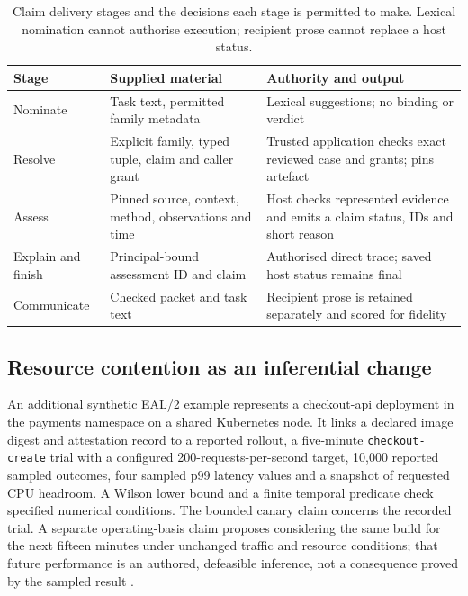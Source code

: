\documentclass[preprint,12pt]{elsarticle}
\begin{document}
\begin{table}[!htbp]
\centering
\small
\setlength{\tabcolsep}{4pt}
\caption{Claim delivery stages and the decisions each stage is permitted to make. Lexical nomination cannot authorise execution; recipient prose cannot replace a host status.}
\label{tab:host-architecture}
\begin{tabular}{@{}>{\raggedright\arraybackslash}p{2.5cm}>{\raggedright\arraybackslash}p{3.9cm}>{\raggedright\arraybackslash}p{4.7cm}@{}}
\toprule
Stage & Supplied material & Authority and output\\
\midrule
Nominate & Task text, permitted family metadata & Lexical suggestions; no binding or verdict\\
Resolve & Explicit family, typed tuple, claim and caller grant & Trusted application checks exact reviewed case and grants; pins artefact\\
Assess & Pinned source, context, method, observations and time & Host checks represented evidence and emits a claim status, IDs and short reason\\
Explain and finish & Principal-bound assessment ID and claim & Authorised direct trace; saved host status remains final\\
Communicate & Checked packet and task text & Recipient prose is retained separately and scored for fidelity\\
\bottomrule
\end{tabular}
\end{table}

\subsection{Resource contention as an inferential change}\label{sec:kubernetes}
An additional synthetic EAL/2 example represents a checkout-api deployment in the payments namespace on a shared Kubernetes node. It links a declared image digest and attestation record to a reported rollout, a five-minute \texttt{checkout-create} trial with a configured 200-requests-per-second target, 10,000 reported sampled outcomes, four sampled p99 latency values and a snapshot of requested CPU headroom. A Wilson lower bound and a finite temporal predicate check specified numerical conditions. The bounded canary claim concerns the recorded trial. A separate operating-basis claim proposes considering the same build for the next fifteen minutes under unchanged traffic and resource conditions; that future performance is an authored, defeasible inference, not a consequence proved by the sampled result \citep{earlKubeExample}.
\end{document}
